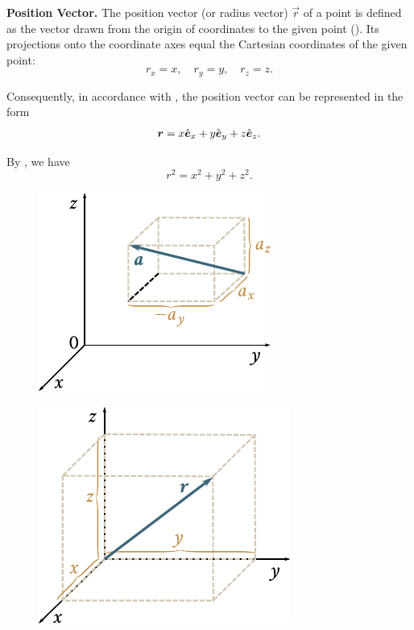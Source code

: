 \textbf{Position Vector.} The position vector (or radius vector) $\vec{r}$ of a point is defined as the vector drawn from the origin of coordinates to the given point (). Its projections onto the coordinate axes equal the Cartesian coordinates of the given point:
\begin{equation}\label{eq:1_12}
r_x=x,\quad r_y=y,\quad r_z=z.
\end{equation}

\noindent
Consequently, in accordance with , the position vector can be represented in the form
\begin{equation}\label{eq:1_13}
\boldsymbol{r} = x\hat{\boldsymbol{e}}_{x} + y\hat{\boldsymbol{e}}_{y} + z\hat{\boldsymbol{e}}_{z}.
\end{equation}

\noindent
By , we have
\begin{equation}\label{eq:1_14}
r^2 = x^2 + y^2 + z^2.
\end{equation}

\begin{figure}[t]
	\begin{minipage}[t]{0.5\linewidth}
		\begin{center}
			\includegraphics[scale=1]{figures/ch_01/fig_1_13.pdf}
			\caption[]{}
			\label{fig:1_13}
		\end{center}
	\end{minipage}
	\hfill{ }%
	\begin{minipage}[t]{0.5\linewidth}
		\begin{center}
			\includegraphics[scale=0.95]{figures/ch_01/fig_1_14.pdf}
			\caption[]{}
			\label{fig:1_14}
		\end{center}
	\end{minipage}
\vspace{-0.3cm}
\end{figure}


